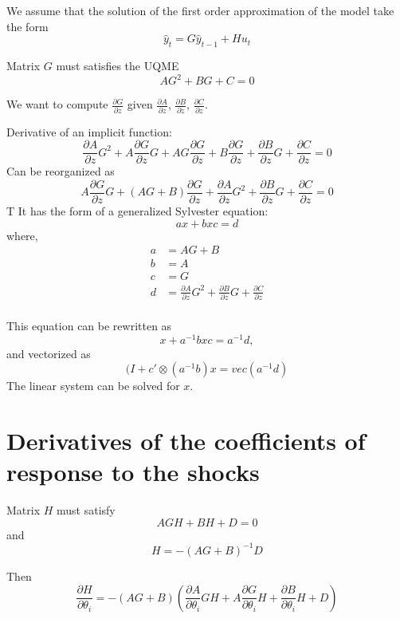\documentclass{article}
\begin{document}
We assume that the solution of the first order approximation of the
model take the form
\[
\hat y_t = G\hat y_{t-1} + Hu_t
\]

Matrix $G$ must satisfies the UQME
\[
A G^2 + B G + C = 0
\]

We want to compute $\frac{\partial G}{\partial z}$ given $\frac{\partial
  A}{\partial z}$, $\frac{\partial B}{\partial z}$, $\frac{\partial
  C}{\partial z}$.

Derivative of an implicit function:
\[
  \frac{\partial A}{\partial z}G^2 + A\frac{\partial G}{\partial z}G
  + AG\frac{\partial G}{\partial z} + B\frac{\partial G}{\partial z}
  + \frac{\partial B}{\partial z}G + \frac{\partial C}{\partial z} = 0
\]
Can be reorganized as
\[
  A\frac{\partial G}{\partial z}G
  + (AG + B)\frac{\partial G}{\partial z} +\frac{\partial A}{\partial z}G^2 
  + \frac{\partial B}{\partial z}G + \frac{\partial C}{\partial z} = 0
\]
T
It has the form of a generalized Sylvester equation:
\[
  ax + bxc = d
\]
where, 
\begin{align*}
  a &= AG + B\\
  b &= A\\
  c &= G\\
  d &= \frac{\partial A}{\partial z}G^2 
      + \frac{\partial B}{\partial z}G + \frac{\partial C}{\partial z}\\
\end{align*}

This equation can be rewritten as
\[
  x + a^{-1}bxc = a^{-1}d,
\]  
and vectorized as
\[
  (I + c'\otimes(a^{-1}b)x = vec(a^{-1}d)
\]
The linear system can be solved for $x$.


\section{Derivatives of the coefficients of response to the shocks}
Matrix $H$ must satisfy
\[
A G H + BH + D = 0
\]
and
\[
H = -(AG + B)^{-1}D
\]

Then
\[
\frac{\partial H}{\partial \theta_i} = -(AG + B)\left(\frac{\partial
  A}{\partial \theta_i}GH + A\frac{\partial G}{\partial \theta_i}H +
  \frac{\partial B}{\partial \theta_i}H + D\right)
\]
\end{document}
